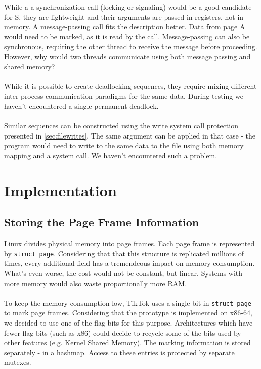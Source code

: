 While a a synchronization call (locking or signaling) would be a good candidate for S, they are lightweight and their arguments
are passed in registers, not in memory. A message-passing call fits the description better. Data from page A would need to be marked,
as it is read by the call. Message-passing can also be synchronous, requiring the other thread to receive the message before proceeding.
However, why would two threads communicate using both message passing and shared memory?
\\
\\
While it is possible to create deadlocking sequences, they require mixing different inter-process communication
paradigms for the same data. During testing we haven't encountered a single permanent deadlock.
\\
\\
Similar sequences can be constructed using the write system call protection presented in \autoref{sec:filewrites}. The same argument
can be applied in that case - the program would need to write to the same data to the file using both memory mapping and a system call. We
haven't encountered such a problem.


\section{Implementation}

\subsection{Storing the Page Frame Information}

Linux divides physical memory into page frames. Each page frame is represented by \texttt{struct page}. Considering that that this structure
is replicated millions of times, every additional field has a tremendeous impact on memory consumption. What's even worse, the cost would not
be constant, but linear. Systems with more memory would also waste proportionally more RAM.
\\
\\
To keep the memory consumption low, TikTok uses a single bit in \texttt{struct page} to mark page frames. Considering that the prototype is implemented on x86-64,
we decided to use one of the flag bits for this purpose. Architectures which have fewer flag bits (such as x86) could decide to recycle some of
the bits used by other features (e.g. Kernel Shared Memory). The marking information is stored separately - in a hashmap.
Access to these entries is protected by separate mutexes.

